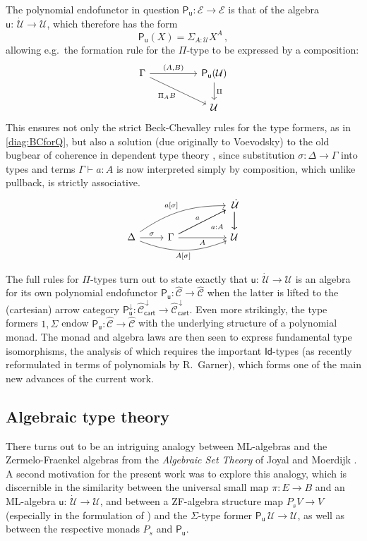 \documentclass[12pt,reqno]{amsart}
\newcommand{\CC}{\ensuremath{\mathcal{C}}}
\newcommand{\EE}{\ensuremath{\mathcal{E}}}
\newcommand{\alg}[1]{\ensuremath{\mathsf{#1}}}
\renewcommand{\to}{\ensuremath{\rightarrow}}
\newcommand{\too}{\ensuremath{\longrightarrow}}
\newcommand{\Id}{\mathsf{Id}}
\newcommand{\U}{\ensuremath{\mathcal{U}}}
\newcommand{\UU}{\ensuremath{\,\dot{\mathcal{U}}}}
\renewcommand{\u}{\ensuremath{\mathsf{u}}}
\renewcommand{\t}{\ensuremath{\mathsf{u}}}
\theoremstyle{remark}
\theoremstyle{definition}
\begin{document}
The polynomial endofunctor in question $\alg{P}_\t : \EE \to \EE$  is that of the algebra $\u:\UU \to \U$, which therefore has the form
\[
\alg{P}_{\u}(X) = \Sigma_{A: \U} X^A\,,
\]
allowing e.g.\ the formation rule for the $\Pi$-type to be expressed by a composition:
\begin{equation*}
\begin{tikzcd}
 \Gamma \ar[rr, "{(A,B)}" ] \ar[rrd,swap,  "{\Pi_A B}"] &&\alg{P}_\u (\U) \ar[d, "{\Pi}"] \\
 && \U
\end{tikzcd}
\end{equation*} 
This ensures not only the strict Beck-Chevalley rules for the type formers, as in \eqref{diag:BCforQ}, but also a solution (due originally to Voevodsky) to the old bugbear of coherence in dependent type theory \cite{Hofmann:1994}, since substitution $\sigma : \Delta \to \Gamma$ into types and terms $\Gamma \vdash a:A$ is now interpreted simply by composition, which unlike pullback, is strictly associative.
\[
\begin{tikzcd}
 	&&&  {\UU} \ar[d]\ar[d]\\
\Delta \ar[r,  "{\sigma}"] \ar[rrru, bend left = 4ex, "{a[\sigma]}"]\ar[rrr, swap, bend right = 5ex, "{A[\sigma]}"] & \Gamma \ar[rru, "a"]   \ar[rru, swap, "{\ \ a:A}"]  \ar[rr ,swap,  "A"]  && {\U}
\end{tikzcd}
\]

The full rules for $\Pi$-types turn out to state exactly that $\u : \UU\to\U$ is an algebra for its own polynomial endofunctor $\alg{P}_{\u} : \widehat{\CC} \to \widehat{\CC}$ when the latter is lifted to the (cartesian) arrow category $\alg{P}_{\u}^{\downarrow}: \widehat{\CC}^{\,\downarrow}_{\mathsf{cart}} \too \widehat{\CC}^{\,\downarrow}_{\mathsf{cart}}$.
Even more strikingly, the type formers $1, \Sigma$ endow $\alg{P}_{\u} : \widehat{\CC} \to \widehat{\CC}$ with the underlying structure of a polynomial monad.  The monad and algebra laws are then seen to express fundamental type isomorphisms, the analysis of which requires the important $\Id{}$-types (as recently reformulated in terms of polynomials by R.\ Garner), which forms one of the main new advances of the current work.

\subsection*{Algebraic type theory} There turns out to be an intriguing analogy between ML-algebras and the Zermelo-Fraenkel algebras from the \emph{Algebraic Set Theory} of Joyal and Moerdijk \cite{JM:AST}.  A second motivation for the present work was to explore this analogy, which is discernible in the similarity between the universal small map $\pi : E \to B$ and an ML-algebra $\u : \UU \to \U$, and between a ZF-algebra structure map $P_sV \to V$ (especially in the formulation of \cite{Simpson:1999}) and the $\Sigma$-type former $\alg{P}_{\!\u}\, \U \to \U$, as well as between the respective monads $P_s$ and $\alg{P}_{\!\u}$. 
\end{document}
